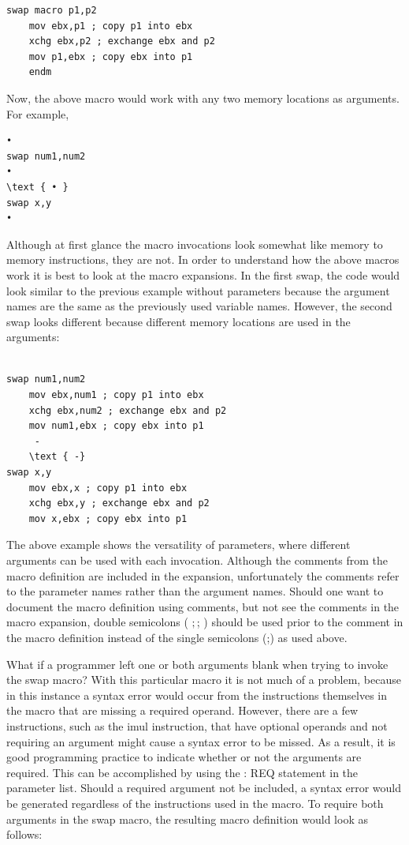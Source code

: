 \documentclass[10pt]{article}
\begin{document}
\begin{verbatim}
swap macro p1,p2
    mov ebx,p1 ; copy p1 into ebx
    xchg ebx,p2 ; exchange ebx and p2
    mov p1,ebx ; copy ebx into p1
    endm
\end{verbatim}

Now, the above macro would work with any two memory locations as arguments. For example,

\begin{verbatim}
•
swap num1,num2
•
\text { • }
swap x,y
•
\end{verbatim}

Although at first glance the macro invocations look somewhat like memory to memory instructions, they are not. In order to understand how the above macros work it is best to look at the macro expansions. In the first swap, the code would look similar to the previous example without parameters because the argument\\
names are the same as the previously used variable names. However, the second swap looks different because different memory locations are used in the arguments:

\begin{verbatim}
     
swap num1,num2
    mov ebx,num1 ; copy p1 into ebx
    xchg ebx,num2 ; exchange ebx and p2
    mov num1,ebx ; copy ebx into p1
     -
    \text { -}
swap x,y
    mov ebx,x ; copy p1 into ebx
    xchg ebx,y ; exchange ebx and p2
    mov x,ebx ; copy ebx into p1
\end{verbatim}

The above example shows the versatility of parameters, where different arguments can be used with each invocation. Although the comments from the macro definition are included in the expansion, unfortunately the comments refer to the parameter names rather than the argument names. Should one want to document the macro definition using comments, but not see the comments in the macro expansion, double semicolons ( $;$; ) should be used prior to the comment in the macro definition instead of the single semicolons (;) as used above.

What if a programmer left one or both arguments blank when trying to invoke the swap macro? With this particular macro it is not much of a problem, because in this instance a syntax error would occur from the instructions themselves in the macro that are missing a required operand. However, there are a few instructions, such as the imul instruction, that have optional operands and not requiring an argument might cause a syntax error to be missed. As a result, it is good programming practice to indicate whether or not the arguments are required. This can be accomplished by using the : REQ statement in the parameter list. Should a required argument not be included, a syntax error would be generated regardless of the instructions used in the macro. To require both arguments in the swap macro, the resulting macro definition would look as follows:
\end{document}
